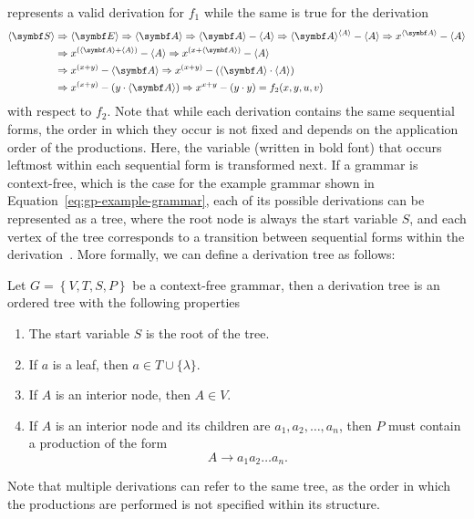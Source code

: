 represents a valid derivation for $f_1$ while the same is true for the derivation
\begin{equation}
\begin{aligned}
	\bps{S} & \Rightarrow \bps E \Rightarrow \bps A \Rightarrow \bps A - \ps A \Rightarrow \bps{A}^{\ps A} - \ps A
	\Rightarrow x^{\bps A} - \ps A 	
	\\ & \Rightarrow x^{(\bps A + \ps A)} - \ps A \Rightarrow x^{(x + \bps A)} - \ps A 
	\\ & \Rightarrow x^{(x + y)} - \bps A \Rightarrow x^{(x + y)} - (\bps A \cdot \ps A) 
	\\ & \Rightarrow x^{(x + y)} - (y \cdot \bps A) \Rightarrow x^{x + y} - (y \cdot y) = f_2(x,y,u,v)
\end{aligned}
\end{equation}
with respect to $f_2$. 
Note that while each derivation contains the same sequential forms, the order in which they occur is not fixed and depends on the application order of the productions.
Here, the variable (written in bold font) that occurs leftmost within each sequential form is transformed next.
If a grammar is context-free, which is the case for the example grammar shown in Equation~\eqref{eq:gp-example-grammar}, each of its possible derivations can be represented as a tree, where the root node is always the start variable $S$, and each vertex of the tree corresponds to a transition between sequential forms within the derivation~\cite{linz2006introduction}.
More formally, we can define a derivation tree as follows:
\begin{definition}\label{def:derivation-tree}
	Let $G = \left\{V, T, S, P\right\}$ be a context-free grammar, then a derivation tree is an ordered tree with the following properties
	\begin{enumerate}
		\item The start variable $S$ is the root of the tree.
		\item If $a$ is a leaf, then $a \in T \cup \{\lambda \}$.
		\item If $A$ is an interior node, then $A \in V$.
		\item If $A$ is an interior node and its children are $a_1, a_2, \dots, a_n$, then $P$ must contain a production of the form
		\begin{equation*}
			A \to a_1 a_2 \dots a_n.
		\end{equation*}  
	\end{enumerate}
\end{definition}
Note that multiple derivations can refer to the same tree, as the order in which the productions are performed is not specified within its structure.
